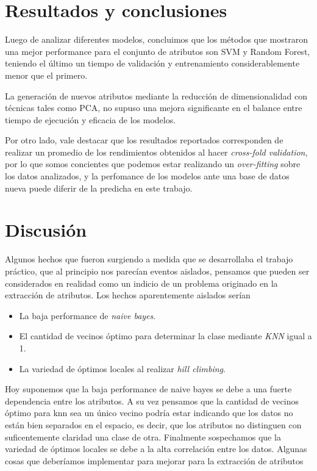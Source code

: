 \documentclass[a4paper,10pt]{article}
\begin{document}
\section{Resultados y conclusiones}

\par Luego de analizar diferentes modelos, concluimos que los métodos que mostraron una mejor performance para el conjunto de atributos son SVM y Random Forest, teniendo el último un tiempo de validación y entrenamiento considerablemente menor que el primero.
\par La generación de nuevos atributos mediante la reducción de dimensionalidad con técnicas tales como PCA, no supuso una mejora significante en el balance entre tiempo de ejecución y eficacia de los modelos. 
\par Por otro lado, vale destacar que los resultados reportados corresponden de realizar un promedio de los rendimientos obtenidos al hacer \emph{cross-fold validation}, por lo que somos concientes que podemos estar realizando un \emph{over-fitting} sobre los datos analizados, y la perfomance de los modelos ante una base de datos nueva puede diferir de la predicha en este trabajo. 

\section{Discusi\'on}

Algunos hechos que fueron surgiendo a medida que se desarrollaba el trabajo pr\'actico, que al principio nos parec\'ian eventos aislados, pensamos que pueden ser considerados en realidad como un indicio de un problema originado en la extracci\'on de atributos. Los hechos aparentemente aislados ser\'ian

\begin{itemize}
 \item La baja performance de \emph{naive bayes}. 
 \item El cantidad de vecinos \'optimo para determinar la clase mediante \emph{KNN} igual a 1. 
 \item La variedad de \'optimos locales al realizar \emph{hill climbing}. 
\end{itemize}

Hoy suponemos que la baja performance de naive bayes se debe a una fuerte dependencia entre los atributos. A su vez pensamos que la cantidad de vecinos \'optimo para knn sea un \'unico vecino podr\'ia estar indicando que los datos no est\'an bien separados en el espacio, es decir, que los atributos no distinguen con suficentemente claridad una clase de otra. Finalmente sospechamos que la variedad de \'optimos locales se debe a la alta correlaci\'on entre los datos. 
Algunas cosas que deber\'iamos implementar para mejorar para la extracci\'on de atributos 
\end{document}
